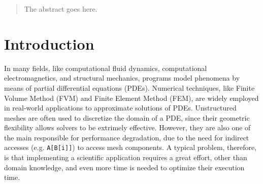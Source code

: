 \documentclass[conference]{IEEEtran}
\begin{document}




\maketitle


\begin{abstract}
The abstract goes here.
\end{abstract}





%
\IEEEpeerreviewmaketitle



\section{Introduction}
In many fields, like computational fluid dynamics, computational electromagnetics, and structural mechanics, programs model phenomena by means of partial differential equations (PDEs). Numerical techniques, like Finite Volume Method (FVM) and Finite Element Method (FEM), are widely employed in real-world applications to approximate solutions of PDEs. Unstructured meshes are often used to discretize the domain of a PDE, since their geometric flexibility allows solvers to be extrimely effective. However, they are also one of the main responsible for performance degradation, due to the need for indirect accesses (e.g. \texttt{A[B[i]]}) to access mesh components. A typical problem, therefore, is that implementing a scientific application requires a great effort, other than domain knowledge, and even more time is needed to optimize their execution time. 
\end{document}
